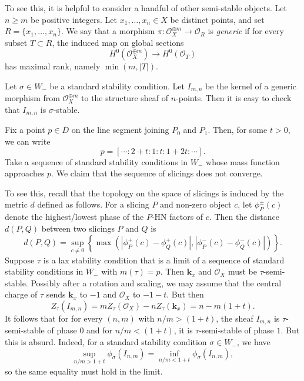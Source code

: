 \documentclass{amsart}
\begin{document}
To see this, it is helpful to consider a handful of other semi-stable objects.
Let \(n \geq m\) be positive integers.
Let \(x_1, \dots, x_n \in X\) be distinct points, and set \(R = \{x_1, \dots, x_n\}\).
We say that a morphism \( \pi \colon \mathcal{O}_X^{\oplus m} \to \mathcal{O}_R\) is \emph{generic} if for every subset \(T \subset R\), the induced map on global sections
\[ H^0(\mathcal{O}_X^{\oplus m}) \to H^0(\mathcal{O}_T)\]
has maximal rank, namely \(\min(m, |T|)\).

Let \(\sigma \in W_-\) be a standard stability condition.
Let \(I_{m,n}\) be the kernel of a generic morphism from \(\mathcal{O}_X^{\oplus m}\) to the structure sheaf of \(n\)-points.
Then it is easy to check that \(I_{m,n}\) is \(\sigma\)-stable.

Fix a point \(p \in \overline D\) on the line segment joining \(P_0\) and \(P_1\).
Then, for some \(t > 0\), we can write
\[ p = [ \cdots : 2 + t: 1: t : 1+2t : \cdots].\]
Take a sequence of standard stability conditions in \(W_{-}\) whose mass function approaches \(p\).
We claim that the sequence of slicings does not converge.

To see this, recall that the topology on the space of slicings is induced by the metric \(d\) defined as follows.
For a slicing \(P\) and non-zero object \(c\), let \(\phi^{\pm}_P(c)\) denote the highest/lowest phase of the \(P\)-HN factors of \(c\).
Then the distance \(d(P,Q)\) between two slicings \(P\) and \(Q\) is
\[ d(P,Q) = \operatorname{sup}_{c \neq 0}\left\{ \max(|\phi_{P}^+(c) - \phi_{Q}^+(c)|, |\phi^-_P(c) - \phi^-_Q(c)|)\right\}.\]
Suppose \(\tau\) is a lax stability condition that is a limit of a sequence of standard stability conditions in \(W_-\) with \(m(\tau) = p\).
Then \(\mathbf{k}_x\) and \(\mathcal{O}_X\) must be \(\tau\)-semi-stable.
Possibly after a rotation and scaling, we may assume that the central charge of \(\tau\) sends \(\mathbf{k}_x\) to \(-1\) and \(\mathcal{O}_X\) to \(-1-t\).
But then
\[ Z_{\tau}(I_{m,n}) = mZ_{\tau}(\mathcal{O}_X) - n Z_{\tau}(\mathbf{k}_x) = n - m(1+t).\]
It follows that for for every \((n,m)\) with \(n/m > (1+t)\), the sheaf \(I_{m,n}\) is \(\tau\)-semi-stable of phase \(0\) and for \(n/m < (1+t)\), it is \(\tau\)-semi-stable of phase \(1\).
But this is absurd.
Indeed, for a standard stability condition \(\sigma \in W_-\), we have
\[ \sup_{n/m > 1+t} \phi_{\sigma}(I_{n,m}) = \inf_{n/m < 1+t} \phi_{\sigma}(I_{n,m}),\]
so the same equality must hold in the limit.
\end{document}
